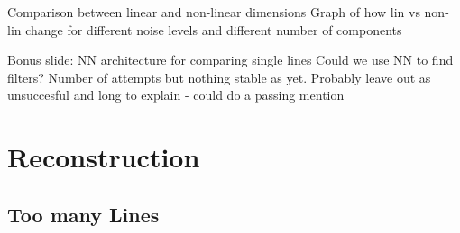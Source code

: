 \documentclass[t, 11pt]{beamer}
\begin{document}
\begin{frame}[fragile]{Comparison between linear and non-linear dimensions}
  Graph of how lin vs non-lin change for different noise levels and different number of components
\end{frame}

\begin{frame}[fragile]{Bonus slide: NN architecture for comparing single lines}
  Could we use NN to find filters? Number of attempts but nothing stable as yet.
  Probably leave out as unsuccesful and long to explain - could do a passing mention
\end{frame}

\section{Reconstruction}
\subsection*{Too many Lines}

\end{document}
